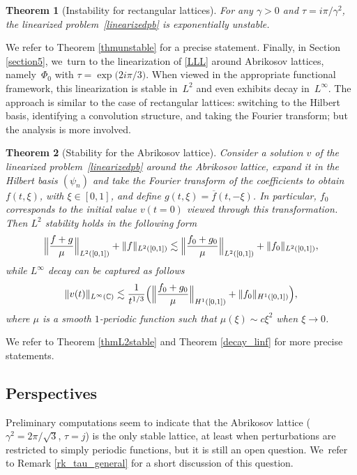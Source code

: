 \documentclass[10pt]{amsart}
\newtheorem{theorem}{Theorem}[section]
\theoremstyle{definition}
\let\EE\exp
\let\ov\overline
\newcommand\C{\mathbb C}
\begin{document}
\begin{theorem}[Instability for rectangular lattices]
For any $\gamma>0$ and $\tau = {i \pi}/{\gamma^2}$, the linearized problem~\eqref{linearizedpb} is exponentially unstable.
\end{theorem}

We refer to Theorem \ref{thmunstable} for a precise statement.
Finally, in Section \ref{section5}, we~turn to the linearization of \eqref{LLL} around Abrikosov lattices, namely~$\Phi_0$ with $\tau = \EE\bigl({{2i\pi}/{3}}\bigr)$. When viewed in the appropriate functional framework, this linearization is stable in~$L^2$ and even exhibits decay in~$L^\infty$. The approach is similar to the case of rectangular lattices: switching to the Hilbert basis, identifying a convolution structure, and taking the Fourier transform; but the analysis is more involved.


\begin{theorem}[Stability for the Abrikosov lattice]
Consider a solution $v$ of the linearized problem~\eqref{linearizedpb} around the Abrikosov lattice, expand it in the Hilbert basis $(\psi_n)$ and take the Fourier transform of the coefficients to obtain $f(t,\xi)$, with $\xi \in [0,1]$, and define $g(t,\xi)=\ov{f}(t,-\xi)$. In particular, $f_0$ corresponds to the initial value $v(t=0)$ viewed through this transformation.
Then $L^2$ stability holds in the following form
\[
\Bigl\| \frac{f+g}{\mu} \Bigr\|_{L^2([0,1])} + \| f \|_{L^2([0,1])} \lesssim \Bigl\| \frac{f_0+g_0}{\mu} \Bigr\|_{L^2([0,1])} + \| f_0 \|_{L^2([0,1])},
\]
while $L^\infty$ decay can be captured as follows
\[
\| v(t) \|_{L^\infty(\C)} \lesssim \frac{1}{t^{1/3}} \Bigl(\Bigl\| \frac{f_0+g_0}{\mu} \Bigr\|_{H^1([0,1])} + \| f_0 \|_{H^1([0,1])} \Bigr),
\]
where $\mu$ is a smooth $1$-periodic function such that $\mu(\xi) \sim c \xi^2$ when $\xi \to 0$.
\end{theorem}


We refer to Theorem \ref{thmL2stable} and Theorem \ref{decay_linf} for more precise statements.

\subsection{Perspectives}

Preliminary computations seem to indicate that the Abrikosov lattice ($\gamma^2 = {2\pi}/{\sqrt 3}$, $\tau =j$) is the only stable lattice, at least when perturbations are restricted to simply periodic functions, but it is still an open question. We~refer to Remark \ref{rk_tau_general} for a short discussion of this question.
\end{document}
